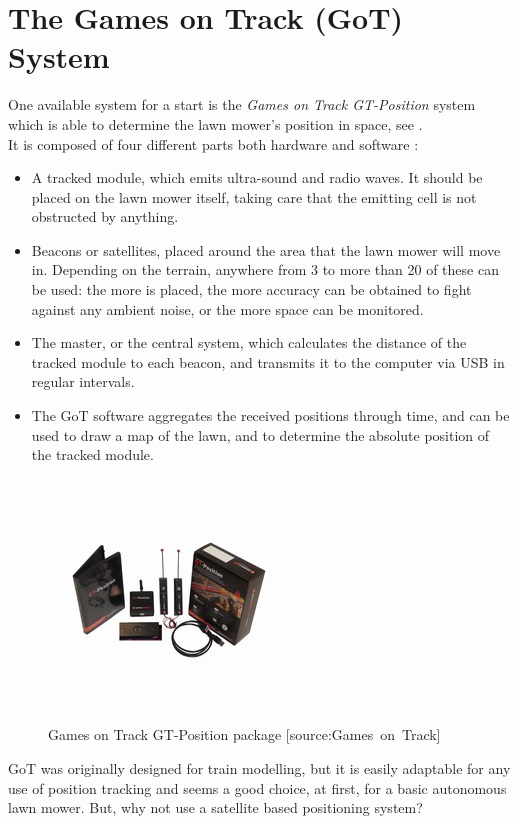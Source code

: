\section{The Games on Track (GoT) System}
One available system for a start is the \emph{Games on Track GT-Position} system which is able to determine the lawn mower's position in space, see .\\
%
It is composed of four different parts both hardware and software \cite{GoTWebsitePos} :
\begin{itemize}
	\item A tracked module, which emits ultra-sound and radio waves. It should be placed on the lawn mower itself, taking care that the emitting cell is not obstructed by anything.
	\item Beacons or satellites, placed around the area that the lawn mower will move in. Depending on the terrain, anywhere from 3 to more than 20 of these can be used: the more is placed, the more accuracy can be obtained to fight against any ambient noise, or the more space can be monitored.
	\item The master, or the central system, which calculates the distance of the tracked module to each beacon, and transmits it to the computer via USB in regular intervals.
	\item The GoT software aggregates the received positions through time, and can be used to draw a map of the lawn, and to determine the absolute position of the tracked module.
\end{itemize}

\begin{figure}[H]
\centering
\includegraphics[scale=1.1]{figures/gotSystem.jpg} 
\caption{Games on Track GT-Position package [source:Games\ on\ Track]} 
\label{fig:GoTsystem}
\end{figure}
\noindent

GoT was originally designed for train modelling, but it is easily adaptable for any use of position tracking and seems a good choice, at first, for a basic autonomous lawn mower.
But, why not use a satellite based positioning system?